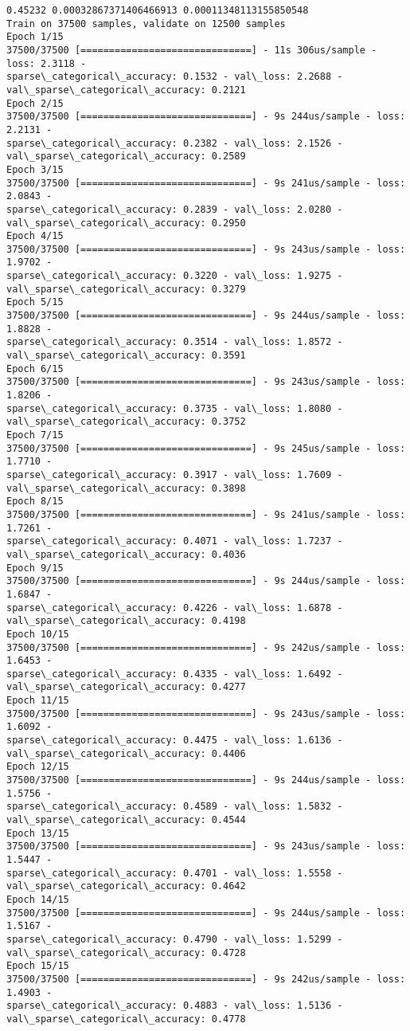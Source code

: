 \documentclass[11pt]{article}
\begin{document}
    \begin{Verbatim}[commandchars=\\\{\}]
0.45232 0.00032867371406466913 0.00011348113155850548
Train on 37500 samples, validate on 12500 samples
Epoch 1/15
37500/37500 [==============================] - 11s 306us/sample - loss: 2.3118 -
sparse\_categorical\_accuracy: 0.1532 - val\_loss: 2.2688 -
val\_sparse\_categorical\_accuracy: 0.2121
Epoch 2/15
37500/37500 [==============================] - 9s 244us/sample - loss: 2.2131 -
sparse\_categorical\_accuracy: 0.2382 - val\_loss: 2.1526 -
val\_sparse\_categorical\_accuracy: 0.2589
Epoch 3/15
37500/37500 [==============================] - 9s 241us/sample - loss: 2.0843 -
sparse\_categorical\_accuracy: 0.2839 - val\_loss: 2.0280 -
val\_sparse\_categorical\_accuracy: 0.2950
Epoch 4/15
37500/37500 [==============================] - 9s 243us/sample - loss: 1.9702 -
sparse\_categorical\_accuracy: 0.3220 - val\_loss: 1.9275 -
val\_sparse\_categorical\_accuracy: 0.3279
Epoch 5/15
37500/37500 [==============================] - 9s 244us/sample - loss: 1.8828 -
sparse\_categorical\_accuracy: 0.3514 - val\_loss: 1.8572 -
val\_sparse\_categorical\_accuracy: 0.3591
Epoch 6/15
37500/37500 [==============================] - 9s 243us/sample - loss: 1.8206 -
sparse\_categorical\_accuracy: 0.3735 - val\_loss: 1.8080 -
val\_sparse\_categorical\_accuracy: 0.3752
Epoch 7/15
37500/37500 [==============================] - 9s 245us/sample - loss: 1.7710 -
sparse\_categorical\_accuracy: 0.3917 - val\_loss: 1.7609 -
val\_sparse\_categorical\_accuracy: 0.3898
Epoch 8/15
37500/37500 [==============================] - 9s 241us/sample - loss: 1.7261 -
sparse\_categorical\_accuracy: 0.4071 - val\_loss: 1.7237 -
val\_sparse\_categorical\_accuracy: 0.4036
Epoch 9/15
37500/37500 [==============================] - 9s 244us/sample - loss: 1.6847 -
sparse\_categorical\_accuracy: 0.4226 - val\_loss: 1.6878 -
val\_sparse\_categorical\_accuracy: 0.4198
Epoch 10/15
37500/37500 [==============================] - 9s 242us/sample - loss: 1.6453 -
sparse\_categorical\_accuracy: 0.4335 - val\_loss: 1.6492 -
val\_sparse\_categorical\_accuracy: 0.4277
Epoch 11/15
37500/37500 [==============================] - 9s 243us/sample - loss: 1.6092 -
sparse\_categorical\_accuracy: 0.4475 - val\_loss: 1.6136 -
val\_sparse\_categorical\_accuracy: 0.4406
Epoch 12/15
37500/37500 [==============================] - 9s 244us/sample - loss: 1.5756 -
sparse\_categorical\_accuracy: 0.4589 - val\_loss: 1.5832 -
val\_sparse\_categorical\_accuracy: 0.4544
Epoch 13/15
37500/37500 [==============================] - 9s 243us/sample - loss: 1.5447 -
sparse\_categorical\_accuracy: 0.4701 - val\_loss: 1.5558 -
val\_sparse\_categorical\_accuracy: 0.4642
Epoch 14/15
37500/37500 [==============================] - 9s 244us/sample - loss: 1.5167 -
sparse\_categorical\_accuracy: 0.4790 - val\_loss: 1.5299 -
val\_sparse\_categorical\_accuracy: 0.4728
Epoch 15/15
37500/37500 [==============================] - 9s 242us/sample - loss: 1.4903 -
sparse\_categorical\_accuracy: 0.4883 - val\_loss: 1.5136 -
val\_sparse\_categorical\_accuracy: 0.4778
    \end{Verbatim}
\end{document}
